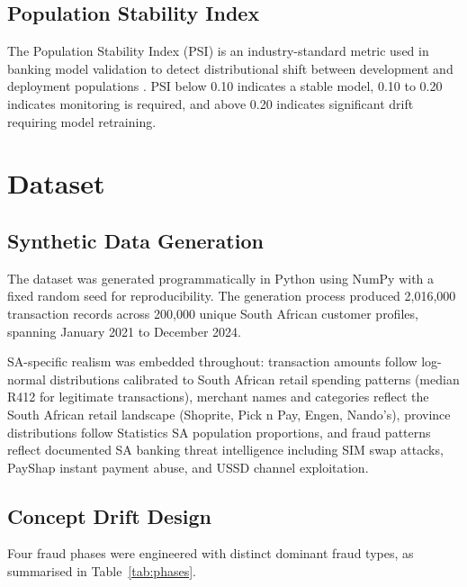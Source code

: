 \documentclass[12pt, a4paper]{article}
\begin{document}
\subsection{Population Stability Index}

The Population Stability Index (PSI) is an industry-standard metric used in banking model validation to detect distributional shift between development and deployment populations \cite{siddiqi2006}. PSI below 0.10 indicates a stable model, 0.10 to 0.20 indicates monitoring is required, and above 0.20 indicates significant drift requiring model retraining.

\section{Dataset}

\subsection{Synthetic Data Generation}

The dataset was generated programmatically in Python using NumPy with a fixed random seed for reproducibility. The generation process produced 2,016,000 transaction records across 200,000 unique South African customer profiles, spanning January 2021 to December 2024.

SA-specific realism was embedded throughout: transaction amounts follow log-normal distributions calibrated to South African retail spending patterns (median R412 for legitimate transactions), merchant names and categories reflect the South African retail landscape (Shoprite, Pick n Pay, Engen, Nando's), province distributions follow Statistics SA population proportions, and fraud patterns reflect documented SA banking threat intelligence including SIM swap attacks, PayShap instant payment abuse, and USSD channel exploitation.

\subsection{Concept Drift Design}

Four fraud phases were engineered with distinct dominant fraud types, as summarised in Table~\ref{tab:phases}.
\end{document}
